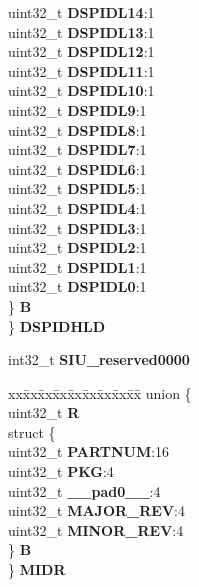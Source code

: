 \begin{DoxyCompactItemize}
\begin{tabbing}
\>\>uint32\_t {\bfseries DSPIDL14}:1\\
\>\>uint32\_t {\bfseries DSPIDL13}:1\\
\>\>uint32\_t {\bfseries DSPIDL12}:1\\
\>\>uint32\_t {\bfseries DSPIDL11}:1\\
\>\>uint32\_t {\bfseries DSPIDL10}:1\\
\>\>uint32\_t {\bfseries DSPIDL9}:1\\
\>\>uint32\_t {\bfseries DSPIDL8}:1\\
\>\>uint32\_t {\bfseries DSPIDL7}:1\\
\>\>uint32\_t {\bfseries DSPIDL6}:1\\
\>\>uint32\_t {\bfseries DSPIDL5}:1\\
\>\>uint32\_t {\bfseries DSPIDL4}:1\\
\>\>uint32\_t {\bfseries DSPIDL3}:1\\
\>\>uint32\_t {\bfseries DSPIDL2}:1\\
\>\>uint32\_t {\bfseries DSPIDL1}:1\\
\>\>uint32\_t {\bfseries DSPIDL0}:1\\
\>\} {\bfseries B}\\
\} {\bfseries DSPIDHLD}\\

\end{tabbing}\item 
\mbox{\label{structSIU__tag_a6527fa714f9141224203dea079151739}} 
int32\+\_\+t {\bfseries S\+I\+U\+\_\+reserved0000}
\item 
\mbox{\label{structSIU__tag_a690a2bdacc80ccc4dc667e2ba2acd553}} 
\begin{tabbing}
xx\=xx\=xx\=xx\=xx\=xx\=xx\=xx\=xx\=\kill
union \{\\
\>uint32\_t {\bfseries R}\\
\>struct \{\\
\>\>uint32\_t {\bfseries PARTNUM}:16\\
\>\>uint32\_t {\bfseries PKG}:4\\
\>\>uint32\_t {\bfseries \_\_pad0\_\_}:4\\
\>\>uint32\_t {\bfseries MAJOR\_REV}:4\\
\>\>uint32\_t {\bfseries MINOR\_REV}:4\\
\>\} {\bfseries B}\\
\} {\bfseries MIDR}\\


\end{tabbing}
\end{DoxyCompactItemize}
